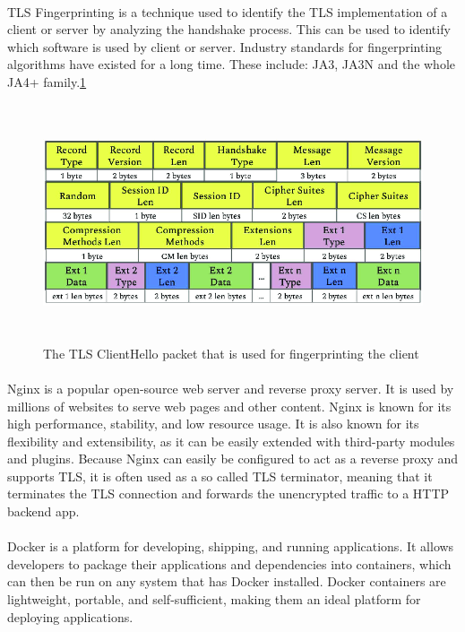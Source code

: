 \documentclass[12pt]{scrbook}
\begin{document}
\paragraph{}
TLS Fingerprinting is a technique used to identify the TLS implementation of a client or server by
analyzing the handshake process. This can be used to identify which software is
used by client or server. Industry standards for fingerprinting algorithms have
existed for a long time. These include: JA3, JA3N and the whole JA4+ family.\ref{fig:clientHelloPacket}
\begin{figure}[!htb] \centering
  \includegraphics[height=7cm]{./images/client_hello_packet.png}
  \caption{The TLS ClientHello packet that is used for fingerprinting the client}
  \label{fig:clientHelloPacket}
\end{figure}

\paragraph{}
Nginx is a popular open-source web server and reverse proxy server. It is
used by millions of websites to serve web pages and other content. Nginx is
known for its high performance, stability, and low resource usage. It is also
known for its flexibility and extensibility, as it can be easily extended with
third-party modules and plugins. Because Nginx can easily be configured to act
as a reverse proxy and supports TLS, it is often used as a so called TLS
terminator, meaning that it terminates the TLS connection and forwards the
unencrypted traffic to a HTTP backend app.

\paragraph{}
Docker is a platform for
developing, shipping, and running applications. It allows developers to package
their applications and dependencies into containers, which can then be run on
any system that has Docker installed. Docker containers are lightweight,
portable, and self-sufficient, making them an ideal platform for deploying
applications.
\end{document}
